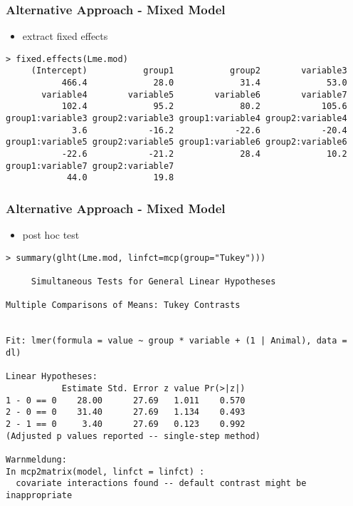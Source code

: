 \begin{frame}\frametitle{Alternative Approach - Mixed Model}
  \begin{itemize}
  \item extract fixed effects
  \end{itemize}
  \scriptsize
\begin{verbatim}
> fixed.effects(Lme.mod)
     (Intercept)           group1           group2        variable3 
           466.4             28.0             31.4             53.0 
       variable4        variable5        variable6        variable7 
           102.4             95.2             80.2            105.6 
group1:variable3 group2:variable3 group1:variable4 group2:variable4 
             3.6            -16.2            -22.6            -20.4 
group1:variable5 group2:variable5 group1:variable6 group2:variable6 
           -22.6            -21.2             28.4             10.2 
group1:variable7 group2:variable7 
            44.0             19.8 
\end{verbatim}
\end{frame}

\begin{frame}\frametitle{Alternative Approach - Mixed Model}
  \begin{itemize}
  \item post hoc test
  \end{itemize}
  \scriptsize
\begin{verbatim}
> summary(glht(Lme.mod, linfct=mcp(group="Tukey")))

	 Simultaneous Tests for General Linear Hypotheses

Multiple Comparisons of Means: Tukey Contrasts


Fit: lmer(formula = value ~ group * variable + (1 | Animal), data = dl)

Linear Hypotheses:
           Estimate Std. Error z value Pr(>|z|)
1 - 0 == 0    28.00      27.69   1.011    0.570
2 - 0 == 0    31.40      27.69   1.134    0.493
2 - 1 == 0     3.40      27.69   0.123    0.992
(Adjusted p values reported -- single-step method)

Warnmeldung:
In mcp2matrix(model, linfct = linfct) :
  covariate interactions found -- default contrast might be inappropriate
\end{verbatim}
\end{frame}

